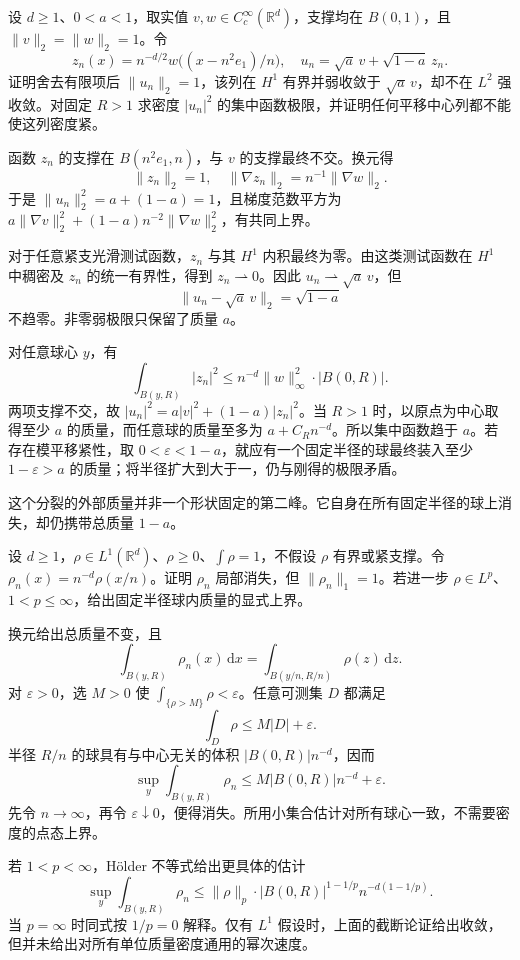 \begin{exercise}\label{b2:ex:app-F-1}
设 \(d\ge1\)、\(0<a<1\)，取实值 \(v,w\in C_c^\infty(\mathbb R^d)\)，支撑均在 \(B(0,1)\)，且 \(\|v\|_2=\|w\|_2=1\)。令
\[
 z_n(x)=n^{-d/2}w\bigl((x-n^2e_1)/n\bigr),
 \quad u_n=\sqrt a\,v+\sqrt{1-a}\,z_n.
\]
证明舍去有限项后 \(\|u_n\|_2=1\)，该列在 \(H^1\) 有界并弱收敛于 \(\sqrt a\,v\)，却不在 \(L^2\) 强收敛。对固定 \(R>1\) 求密度 \(|u_n|^2\) 的集中函数极限，并证明任何平移中心列都不能使这列密度紧。
\end{exercise}
\begin{solution}
函数 \(z_n\) 的支撑在 \(B(n^2e_1,n)\)，与 \(v\) 的支撑最终不交。换元得
\[
 \|z_n\|_2=1,\quad
 \|\nabla z_n\|_2=n^{-1}\|\nabla w\|_2.
\]
于是 \(\|u_n\|_2^2=a+(1-a)=1\)，且梯度范数平方为
\(a\|\nabla v\|_2^2+(1-a)n^{-2}\|\nabla w\|_2^2\)，有共同上界。

对于任意紧支光滑测试函数，\(z_n\) 与其 \(H^1\) 内积最终为零。由这类测试函数在 \(H^1\) 中稠密及 \(z_n\) 的统一有界性，得到 \(z_n\rightharpoonup0\)。因此 \(u_n\rightharpoonup\sqrt a\,v\)，但
\[
 \|u_n-\sqrt a\,v\|_2=\sqrt{1-a}
\]
不趋零。非零弱极限只保留了质量 \(a\)。

对任意球心 \(y\)，有
\[
 \int_{B(y,R)}|z_n|^2
 \le n^{-d}\|w\|_\infty^2\cdot|B(0,R)|.
\]
两项支撑不交，故 \(|u_n|^2=a|v|^2+(1-a)|z_n|^2\)。当 \(R>1\) 时，以原点为中心取得至少 \(a\) 的质量，而任意球的质量至多为 \(a+C_Rn^{-d}\)。所以集中函数趋于 \(a\)。若存在模平移紧性，取 \(0<\varepsilon<1-a\)，就应有一个固定半径的球最终装入至少 \(1-\varepsilon>a\) 的质量；将半径扩大到大于一，仍与刚得的极限矛盾。

这个分裂的外部质量并非一个形状固定的第二峰。它自身在所有固定半径的球上消失，却仍携带总质量 \(1-a\)。
\end{solution}

\begin{exercise}\label{b2:ex:app-F-2}
设 \(d\ge1\)，\(\rho\in L^1(\mathbb R^d)\)、\(\rho\ge0\)、\(\int\rho=1\)，不假设 \(\rho\) 有界或紧支撑。令 \(\rho_n(x)=n^{-d}\rho(x/n)\)。证明 \(\rho_n\) 局部消失，但 \(\|\rho_n\|_1=1\)。若进一步 \(\rho\in L^p\)、\(1<p\le\infty\)，给出固定半径球内质量的显式上界。
\end{exercise}
\begin{solution}
换元给出总质量不变，且
\[
 \int_{B(y,R)}\rho_n(x)\,\mathrm dx
 =\int_{B(y/n,R/n)}\rho(z)\,\mathrm dz.
\]
对 \(\varepsilon>0\)，选 \(M>0\) 使
\(\int_{\{\rho>M\}}\rho<\varepsilon\)。任意可测集 \(D\) 都满足
\[
 \int_D\rho\le M|D|+\varepsilon.
\]
半径 \(R/n\) 的球具有与中心无关的体积 \(|B(0,R)|n^{-d}\)，因而
\[
 \sup_y\int_{B(y,R)}\rho_n
 \le M|B(0,R)|n^{-d}+\varepsilon.
\]
先令 \(n\to\infty\)，再令 \(\varepsilon\downarrow0\)，便得消失。所用小集合估计对所有球心一致，不需要密度的点态上界。

若 \(1<p<\infty\)，Hölder 不等式给出更具体的估计
\[
 \sup_y\int_{B(y,R)}\rho_n
 \le\|\rho\|_p\cdot|B(0,R)|^{1-1/p}n^{-d(1-1/p)}.
\]
当 \(p=\infty\) 时同式按 \(1/p=0\) 解释。仅有 \(L^1\) 假设时，上面的截断论证给出收敛，但并未给出对所有单位质量密度通用的幂次速度。
\end{solution}

